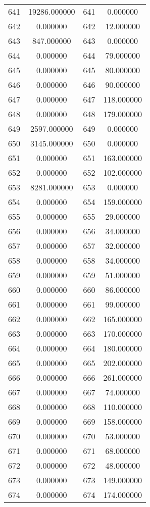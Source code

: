 \documentclass[12pt]{article}
\begin{document}
\begin{longtable}{@{}cccc@{}}
641 & 19286.000000 & 641 & 0.000000 \\
642 & 0.000000 & 642 & 12.000000 \\
643 & 847.000000 & 643 & 0.000000 \\
644 & 0.000000 & 644 & 79.000000 \\
645 & 0.000000 & 645 & 80.000000 \\
646 & 0.000000 & 646 & 90.000000 \\
647 & 0.000000 & 647 & 118.000000 \\
648 & 0.000000 & 648 & 179.000000 \\
649 & 2597.000000 & 649 & 0.000000 \\
650 & 3145.000000 & 650 & 0.000000 \\
651 & 0.000000 & 651 & 163.000000 \\
652 & 0.000000 & 652 & 102.000000 \\
653 & 8281.000000 & 653 & 0.000000 \\
654 & 0.000000 & 654 & 159.000000 \\
655 & 0.000000 & 655 & 29.000000 \\
656 & 0.000000 & 656 & 34.000000 \\
657 & 0.000000 & 657 & 32.000000 \\
658 & 0.000000 & 658 & 34.000000 \\
659 & 0.000000 & 659 & 51.000000 \\
660 & 0.000000 & 660 & 86.000000 \\
661 & 0.000000 & 661 & 99.000000 \\
662 & 0.000000 & 662 & 165.000000 \\
663 & 0.000000 & 663 & 170.000000 \\
664 & 0.000000 & 664 & 180.000000 \\
665 & 0.000000 & 665 & 202.000000 \\
666 & 0.000000 & 666 & 261.000000 \\
667 & 0.000000 & 667 & 74.000000 \\
668 & 0.000000 & 668 & 110.000000 \\
669 & 0.000000 & 669 & 158.000000 \\
670 & 0.000000 & 670 & 53.000000 \\
671 & 0.000000 & 671 & 68.000000 \\
672 & 0.000000 & 672 & 48.000000 \\
673 & 0.000000 & 673 & 149.000000 \\
674 & 0.000000 & 674 & 174.000000 \\

\end{longtable}
\end{document}
